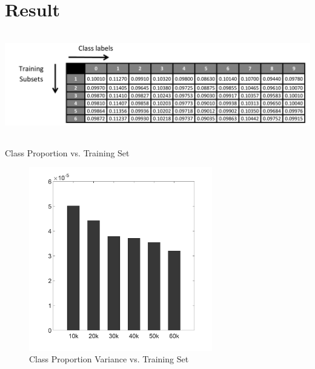 \documentclass[conference]{IEEEtran}
\begin{document}
\section{Result}
\label{sec:Result}
\begin{table}[tmbh]
\raggedright
\includegraphics[width=17cm,height= 4.5cm]{ClassProportionVsTrainingSet.pdf}
\caption{Class Proportion vs. Training Set} 
\label{table:ClassProportionVsTrainingSet}
\end{table}
\begin{figure}[tmbh]
\centering
\includegraphics[width=8cm]{ClassProportionVarianceVsTrainingSet.pdf}
\caption{Class Proportion Variance vs. Training Set}
\label{figure:ClassProportionVarianceVsTrainingSet}
\end{figure}
\end{document}
